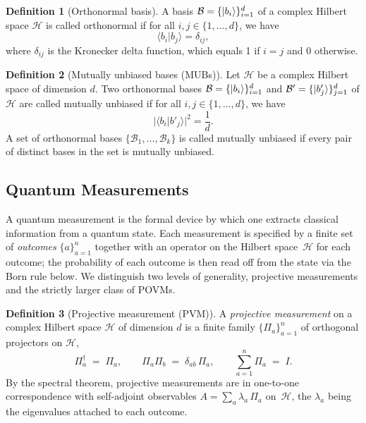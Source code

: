 \documentclass[oneside, a4paper, onecolumn, 11pt]{article}
\theoremstyle{definition}
\newtheorem{definition}{Definition}[section]
\theoremstyle{plain}
\theoremstyle{remark}
\begin{document}
\begin{definition}[Orthonormal basis]
  A basis $\mathcal{B} = \{\ket{b_i}\}_{i=1}^d$ of a complex Hilbert space $\mathcal{H}$ is called orthonormal if for all $i, j \in \{1, \ldots, d\}$, we have
  \begin{equation}
    \langle b_i | b_j \rangle = \delta_{ij},
  \end{equation}
  where $\delta_{ij}$ is the Kronecker delta function, which equals 1 if $i = j$ and 0 otherwise.
  
\end{definition}

\begin{definition}[Mutually unbiased bases (MUBs)]
  Let $\mathcal{H}$ be a complex Hilbert space of dimension $d$. Two orthonormal bases $\mathcal{B} = \{\ket{b_i}\}_{i=1}^d$ and $\mathcal{B}' = \{\ket{b'_j}\}_{j=1}^d$ of $\mathcal{H}$ are called mutually unbiased if for all $i, j \in \{1, \ldots, d\}$, we have
  \begin{equation}
    |\langle b_i | b'_j \rangle|^2 = \frac{1}{d}.
  \end{equation}
  A set of orthonormal bases $\{\mathcal{B}_1, \ldots, \mathcal{B}_k\}$ is called mutually unbiased if every pair of distinct bases in the set is mutually unbiased.
\end{definition}

\subsection{Quantum Measurements}
\label{sec:quantum-measurements}

A quantum measurement is the formal device by which one extracts
classical information from a quantum state. Each measurement is
specified by a finite set of \emph{outcomes}
$\{a\}_{a = 1}^{n}$ together with an operator on the Hilbert
space~$\mathcal{H}$ for each outcome; the probability of each outcome
is then read off from the state via the Born rule below. We
distinguish two levels of generality, projective measurements and the
strictly larger class of POVMs.

\begin{definition}[Projective measurement (PVM)]
\label{def:pvm}
A \emph{projective measurement} on a complex Hilbert space $\mathcal{H}$
of dimension $d$ is a finite family $\{\Pi_a\}_{a = 1}^{n}$ of
orthogonal projectors on $\mathcal{H}$,
\begin{equation}
  \Pi_a^{\dagger} \;=\; \Pi_a, \qquad
  \Pi_a \Pi_b \;=\; \delta_{ab}\, \Pi_a, \qquad
  \sum_{a = 1}^{n} \Pi_a \;=\; I.
  \label{eq:pvm}
\end{equation}
By the spectral theorem, projective measurements are in one-to-one
correspondence with self-adjoint observables
$A = \sum_a \lambda_a\, \Pi_a$ on~$\mathcal{H}$, the $\lambda_a$
being the eigenvalues attached to each outcome.
\end{definition}
\end{document}
